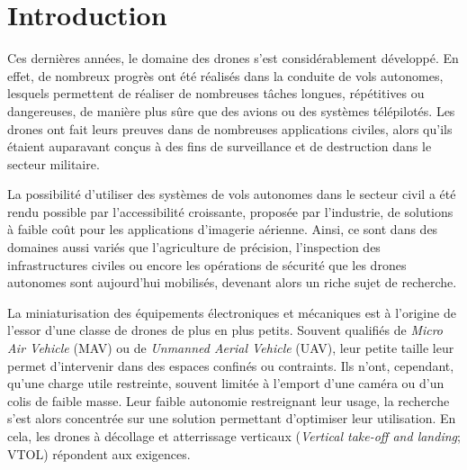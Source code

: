 \chapter*{Introduction}



Ces dernières années, le domaine des drones s'est considérablement développé. En effet, de nombreux progrès ont été réalisés dans la conduite de vols autonomes, lesquels permettent de réaliser de nombreuses tâches longues, répétitives ou dangereuses, de manière plus sûre que des avions ou des systèmes télépilotés. Les drones ont fait leurs preuves dans de nombreuses applications civiles, alors qu'ils étaient auparavant conçus à des fins de surveillance et de destruction dans le secteur militaire.

La possibilité d'utiliser des systèmes de vols autonomes dans le secteur civil a été rendu possible par l'accessibilité croissante, proposée par l'industrie, de solutions à faible coût pour les applications d'imagerie aérienne. Ainsi, ce sont dans des domaines aussi variés que l'agriculture de précision,  l'inspection des infrastructures civiles ou encore les opérations de sécurité que les drones autonomes sont aujourd'hui mobilisés, devenant alors un riche sujet de recherche.

La miniaturisation des équipements électroniques et mécaniques est à l'origine de l'essor d'une classe de drones de plus en plus petits. Souvent qualifiés de \textit{Micro Air Vehicle} (MAV) ou de \textit{Unmanned Aerial Vehicle} (UAV), leur petite taille leur permet d'intervenir dans des espaces confinés ou contraints. Ils n'ont, cependant, qu'une charge utile restreinte, souvent limitée à l'emport d'une caméra ou d'un colis de faible masse. 
Leur faible autonomie restreignant leur usage, la recherche s'est alors concentrée sur une solution permettant d'optimiser leur utilisation. En cela, les drones à décollage et atterrissage verticaux (\textit{Vertical take-off and landing}; VTOL) répondent aux exigences.

